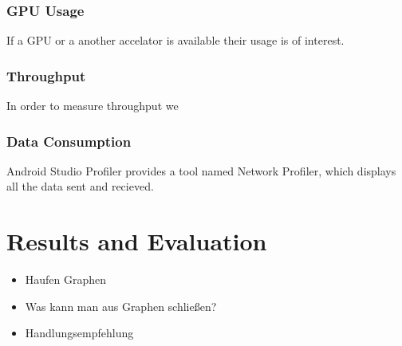 \subsubsection{GPU Usage}
If a GPU or a another accelator is available their usage is of interest.
\subsubsection{Throughput}
In order to measure throughput we 
\subsubsection{Data Consumption}
Android Studio Profiler provides a tool named Network Profiler, which displays all the data sent and recieved.
\section{Results and Evaluation}
\begin{itemize}
    \item Haufen Graphen
    \item Was kann man aus Graphen schließen?
    \item Handlungsempfehlung
\end{itemize}
\endinput 
